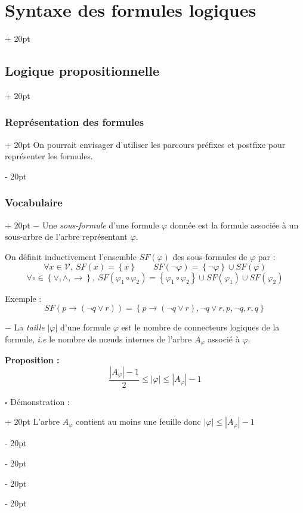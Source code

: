 \documentclass[a4paper, 12pt, twoside]{article}
\newcommand{\set}[1]{\left\{ #1 \right\}}
\newcommand{\abs}[1]{\left\lvert #1 \right\rvert}
\renewcommand{\le}{\leqslant}
\newcommand{\ind}[1][20pt]{\advance\leftskip + #1}
\newcommand{\deind}[1][20pt]{\advance\leftskip - #1}
\newenvironment{indt}[2][20pt]{#2 \par \ind[#1]}{\par \deind} %
\begin{document}
\begin{indt}{\section{Syntaxe des formules logiques}}
\begin{indt}{\subsection{Logique propositionnelle}}
\begin{indt}{\subsubsection{Représentation des formules}}
                On pourrait envisager d'utiliser les parcours préfixes et postfixe pour représenter les formules.
            \end{indt}
            
            \vspace{12pt}
            
            \begin{indt}{\subsubsection{Vocabulaire}}
                $-$ Une \textit{sous-formule} d'une formule $\varphi$ donnée est la formule associée à un sous-arbre de l'arbre représentant $\varphi$.
                
                On définit inductivement l'ensemble $SF(\varphi)$ des sous-formules de $\varphi$ par :
                    \[
                        \forall x \in \mathcal V,\ SF(x) = \set x
                        \qquad
                        SF(\neg \varphi) = \set{\neg \varphi} \cup SF(\varphi)
                    \]
                    \[
                        \forall \circ \in \set{\vee, \wedge, \rightarrow},\ SF(\varphi_1 \circ \varphi_2) = \set{\varphi_1 \circ \varphi_2} \cup SF(\varphi_1) \cup SF(\varphi_2)
                    \]
                
                Exemple :
                    \[ SF(p \rightarrow (\neg q \vee r)) = \set{p \rightarrow (\neg q \vee r), \neg q \vee r, p, \neg q, r, q} \]
                
                \vspace{12pt}
                
                $-$ La \textit{taille} $\abs \varphi$ d'une formule $\varphi$ est le nombre de connecteurs logiques de la formule, \textit{i.e} le nombre de n\oe uds internes de l'arbre $A_\varphi$ associé à $\varphi$.
                
                \vspace{12pt}
                
                \textbf{Proposition :}
                    \[ \dfrac{\abs{A_\varphi} - 1}{2} \le \abs \varphi \le \abs{A_\varphi} - 1 \]
                
                \begin{indt}{$\square$ Démonstration :}
                    L'arbre $A_\varphi$ contient au moins une feuille donc $\abs \varphi \le \abs{A_\varphi} - 1$
                    

\end{indt}
\end{indt}
\end{indt}
\end{indt}
\end{document}
